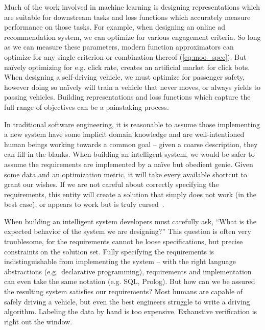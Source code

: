 Much of the work involved in machine learning is designing representations which are suitable for downstream tasks and loss functions which accurately measure performance on those tasks. For example, when designing an online ad recommendation system, we can optimize for various engagement criteria. So long as we can measure these parameters, modern function approximators can optimize for any single criterion or combination thereof (\autoref{eq:moo_spec}). But na\"ively optimizing for e.g. click rate, creates an artificial market for click bots. When designing a self-driving vehicle, we must optimize for passenger safety, however doing so na\"ively will train a vehicle that never moves, or always yields to passing vehicles. Building representations and loss functions which capture the full range of objectives can be a painstaking process.

In traditional software engineering, it is reasonable to assume those implementing a new system have some implicit domain knowledge and are well-intentioned human beings working towards a common goal -- given a coarse description, they can fill in the blanks. When building an intelligent system, we would be safer to assume the requirements are implemented by a na\"ive but obedient genie. Given some data and an optimization metric, it will take every available shortcut to grant our wishes. If we are not careful about correctly specifying the requirements, this entity will create a solution that simply does not work (in the best case), or appears to work but is truly cursed~\citep{bellman1957dynamic}.

When building an intelligent system developers must carefully ask, ``What is the expected behavior of the system we are designing?'' This question is often very troublesome, for the requirements cannot be loose specifications, but precise constraints on the solution set. Fully specifying the requirements is indistinguishable from implementing the system -- with the right language abstractions (e.g.\ declarative programming), requirements and implementation can even take the same notation (e.g. SQL, Prolog). But how can we be assured the resulting system satisfies our requirements? Most humans are capable of safely driving a vehicle, but even the best engineers struggle to write a driving algorithm. Labeling the data by hand is too expensive. Exhaustive verification is right out the window.

